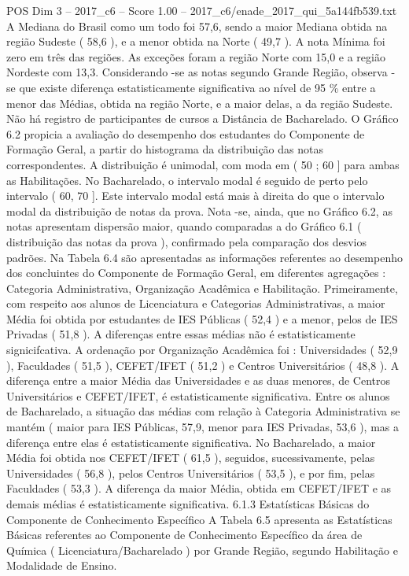 \begin{textsample}{POS Dim 3 – 2017\_c6 – Score 1.00 – 2017\_c6/enade\_2017\_qui\_5a144fb539.txt}
A Mediana do Brasil como um todo foi 57,6, sendo a maior Mediana obtida na região Sudeste ( 58,6 ), e a menor obtida na Norte ( 49,7 ).
A nota Mínima foi zero em três das regiões.
As exceções foram a região Norte com 15,0 e a região Nordeste com 13,3.
Considerando -se as notas segundo Grande Região, observa -se que existe diferença estatisticamente significativa ao nível de 95 \% entre a menor das Médias, obtida na região Norte, e a maior delas, a da região Sudeste.
Não há registro de participantes de cursos a Distância de Bacharelado.
O Gráfico 6.2 propicia a avaliação do desempenho dos estudantes do Componente de Formação Geral, a partir do histograma da distribuição das notas correspondentes.
A distribuição é unimodal, com moda em ( 50 ; 60 ] para ambas as Habilitações.
No Bacharelado, o intervalo modal é seguido de perto pelo intervalo ( 60, 70 ].
Este intervalo modal está mais à direita do que o intervalo modal da distribuição de notas da prova.
Nota -se, ainda, que no Gráfico 6.2, as notas apresentam dispersão maior, quando comparadas a do Gráfico 6.1 ( distribuição das notas da prova ), confirmado pela comparação dos desvios padrões.
Na Tabela 6.4 são apresentadas as informações referentes ao desempenho dos concluintes do Componente de Formação Geral, em diferentes agregações : Categoria Administrativa, Organização Acadêmica e Habilitação.
Primeiramente, com respeito aos alunos de Licenciatura e Categorias Administrativas, a maior Média foi obtida por estudantes de IES Públicas ( 52,4 ) e a menor, pelos de IES Privadas ( 51,8 ).
A diferenças entre essas médias não é estatisticamente signicifcativa.
A ordenação por Organização Acadêmica foi : Universidades ( 52,9 ), Faculdades ( 51,5 ), CEFET/IFET ( 51,2 ) e Centros Universitários ( 48,8 ).
A diferença entre a maior Média das Universidades e as duas menores, de Centros Universitários e CEFET/IFET, é estatisticamente significativa.
Entre os alunos de Bacharelado, a situação das médias com relação à Categoria Administrativa se mantém ( maior para IES Públicas, 57,9, menor para IES Privadas, 53,6 ), mas a diferença entre elas é estatisticamente significativa.
No Bacharelado, a maior Média foi obtida nos CEFET/IFET ( 61,5 ), seguidos, sucessivamente, pelas Universidades ( 56,8 ), pelos Centros Universitários ( 53,5 ), e por fim, pelas Faculdades ( 53,3 ).
A diferença da maior Média, obtida em CEFET/IFET e as demais médias é estatisticamente significativa. 6.1.3 Estatísticas Básicas do Componente de Conhecimento Específico A Tabela 6.5 apresenta as Estatísticas Básicas referentes ao Componente de Conhecimento Específico da área de Química ( Licenciatura/Bacharelado ) por Grande Região, segundo Habilitação e Modalidade de Ensino.

\end{textsample}
